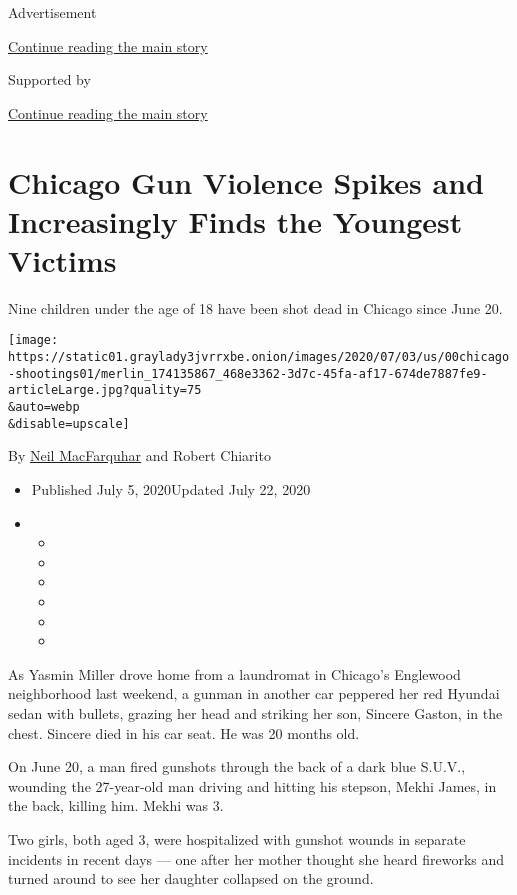 Advertisement

\protect\hyperlink{after-top}{Continue reading the main story}

Supported by

\protect\hyperlink{after-sponsor}{Continue reading the main story}

\hypertarget{chicago-gun-violence-spikes-and-increasingly-finds-the-youngest-victims}{%
\section{Chicago Gun Violence Spikes and Increasingly Finds the Youngest
Victims}\label{chicago-gun-violence-spikes-and-increasingly-finds-the-youngest-victims}}

Nine children under the age of 18 have been shot dead in Chicago since
June 20.

\texttt{[image: https://static01.graylady3jvrrxbe.onion/images/2020/07/03/us/00chicago-shootings01/merlin\_174135867\_468e3362-3d7c-45fa-af17-674de7887fe9-articleLarge.jpg?quality=75\\\&auto=webp\\\&disable=upscale]}

By \href{https://www.nytimes3xbfgragh.onion/by/neil-macfarquhar}{Neil
MacFarquhar} and Robert Chiarito

\begin{itemize}
\item
  Published July 5, 2020Updated July 22, 2020
\item
  \begin{itemize}
  \item
  \item
  \item
  \item
  \item
  \item
  \end{itemize}
\end{itemize}

As Yasmin Miller drove home from a laundromat in Chicago's Englewood
neighborhood last weekend, a gunman in another car peppered her red
Hyundai sedan with bullets, grazing her head and striking her son,
Sincere Gaston, in the chest. Sincere died in his car seat. He was 20
months old.

On June 20, a man fired gunshots through the back of a dark blue S.U.V.,
wounding the 27-year-old man driving and hitting his stepson, Mekhi
James, in the back, killing him. Mekhi was 3.

Two girls, both aged 3, were hospitalized with gunshot wounds in
separate incidents in recent days --- one after her mother thought she
heard fireworks and turned around to see her daughter collapsed on the
ground.

